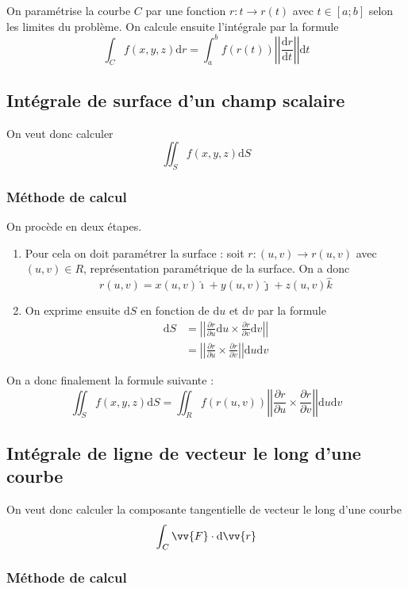 \documentclass[11pt,a4paper]{article}
\theoremstyle{definition}
\newcommand{\dif}{\mathrm{d}}
\newcommand{\kmath}{k}
\newcommand{\fl}{\rightarrow}
\newcommand{\pa}{\partial}
\begin{document}
On paramétrise la courbe $C$ par une fonction $r : t \fl r(t)$ avec $t \in [a;b]$ selon les limites du problème. On calcule ensuite l'intégrale par la formule
\[ \int_C f(x,y,z) \dif r = \int_a^b f(r(t)) \left|\left| \frac{\dif r}{\dif t} \right|\right| \dif t \]

\subsection{Intégrale de surface d'un champ scalaire}

On veut donc calculer
\[ \iint_S f(x,y,z) \dif S \]

\subsubsection{Méthode de calcul}

On procède en deux étapes.
\begin{enumerate}
\item Pour cela on doit paramétrer la surface : soit $r : (u,v) \fl r(u,v)$ avec $(u,v) \in R$, représentation paramétrique de la surface. On a donc
\[ r(u,v) = x(u,v) \hat{\imath} + y(u,v) \hat{\jmath} + z(u,v) \hat{\kmath} \]
\item On exprime ensuite $\dif S$ en fonction de $\dif u$ et $\dif v$ par la formule
\begin{align*} \dif S & = \left| \left| \frac{\pa r}{\pa u} \dif u \times \frac{\pa r}{\pa v} \dif v \right| \right| \\
 											& = \left| \left| \frac{\pa r}{\pa u} \times \frac{\pa r}{\pa v} \right| \right|  \dif u \dif v \end{align*}
\end{enumerate}
On a donc finalement la formule suivante :
\[ \iint_S f(x,y,z) \dif S = \iint_R f(r(u,v)) \left| \left| \frac{\pa r}{\pa u} \times \frac{\pa r}{\pa v} \right| \right|  \dif u \dif v \]

\subsection{Intégrale de ligne de vecteur le long d'une courbe}

On veut donc calculer la composante tangentielle de vecteur le long d'une courbe
\[ \int_C \vv{F} \cdot \dif \vv{r} \]

\subsubsection{Méthode de calcul}
\end{document}
